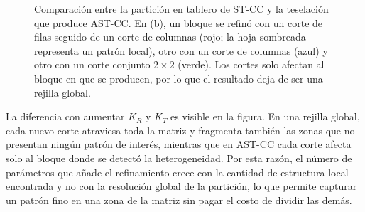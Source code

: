 \begin{figure}[t]
\centering
{}
\caption{Comparación entre la partición en tablero de ST-CC y la teselación que
produce AST-CC. En (b), un bloque se refinó con un corte de filas seguido de un
corte de columnas (rojo; la hoja sombreada representa un patrón local), otro con
un corte de columnas (azul) y otro con un corte conjunto $2\times 2$ (verde).
Los cortes solo afectan al bloque en que se producen, por lo que el resultado
deja de ser una rejilla global.}
\label{fig:prop-teselacion}
\end{figure}

La diferencia con aumentar $K_R$ y $K_T$ es visible en la figura. En una
rejilla global, cada nuevo corte atraviesa toda la matriz y fragmenta también las
zonas que no presentan ningún patrón de interés, mientras que en AST-CC cada corte
afecta solo al bloque donde se detectó la heterogeneidad. Por esta razón, el
número de parámetros que añade el refinamiento crece con la cantidad de estructura
local encontrada y no con la resolución global de la partición, lo que permite
capturar un patrón fino en una zona de la matriz sin pagar el costo de dividir
las demás.

